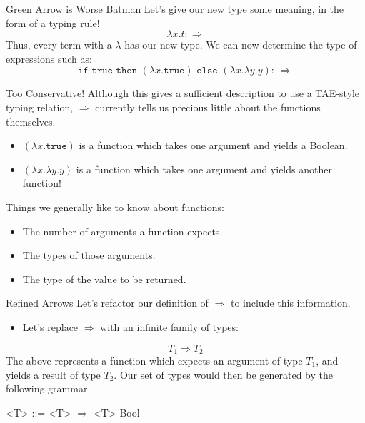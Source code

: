 \documentclass[11pt]{beamer}
\begin{document}
\begin{frame}[fragile=singleslide]{Green Arrow is Worse Batman}
Let's give our new type some meaning, in the form of a typing rule! 
\begin{equation}
\lambda x. t : \Rightarrow
\end{equation}
Thus, every term with a $\lambda$ has our new type.  We can now determine the type of expressions such as:
\begin{equation}
\texttt{if true then } (\lambda x. \texttt{true}) \texttt{ else } (\lambda x. \lambda y. y) :\:\Rightarrow
\end{equation}
\end{frame}

\begin{frame}[fragile=singleslide]{Too Conservative!}
Although this gives a sufficient description to use a TAE-style typing relation, $\Rightarrow$ currently tells us precious little about the functions themselves.  
\begin{itemize}
\item $(\lambda x. \texttt{true})$ is a function which takes one argument and yields a Boolean.
\item $(\lambda x. \lambda y. y)$ is a function which takes one argument and yields another function! 
\end{itemize}
Things we generally like to know about functions:
\begin{itemize}
\item The number of arguments a function expects.
\item The types of those arguments.
\item The type of the value to be returned.  
\end{itemize}
\end{frame}

\begin{frame}[fragile=singleslide]{Refined Arrows}
Let's refactor our definition of $\Rightarrow$ to include this information.
\begin{itemize}
\item Let's replace $\Rightarrow$ with an infinite family of types:
\end{itemize}
\begin{equation}
T_1 \Rightarrow T_2
\end{equation}
The above represents a function which expects an argument of type $T_1$, and yields a result of type $T_2$.  Our set of types would then be generated by the following grammar.\\

\dotfill
\begin{grammar}
<T> ::= <T> $\Rightarrow$ <T>
\alt Bool
\end{grammar}
\dotfill
\end{frame}
\end{document}
